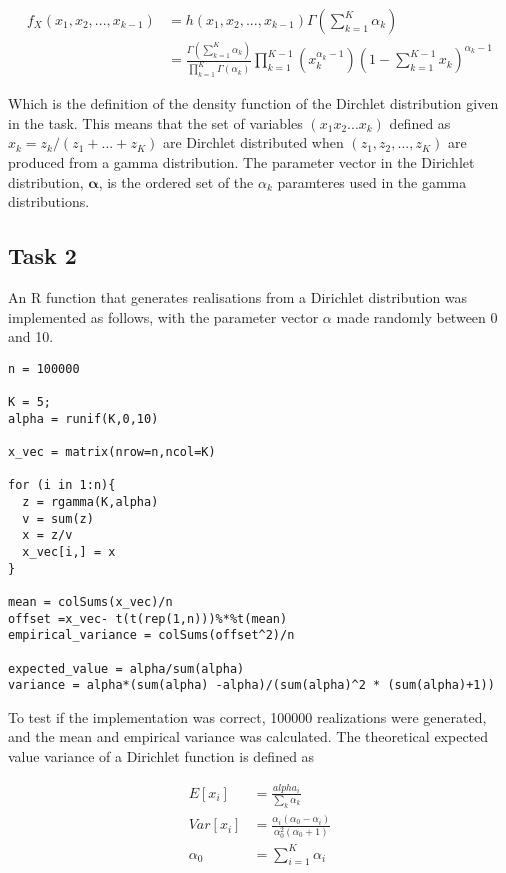\documentclass{article}
\begin{document}
\begin{align}
    f_X(x_1, x_2, ..., x_{k-1}) &= h(x_1,x_2,...,x_{k-1}) \Gamma(\sum_{k=1}^{K}\alpha_k) \\
    &= \frac{\Gamma(\sum_{k=1}^{K}\alpha_k)}{\prod_{k=1}^K \Gamma(\alpha_k)} \prod_{k=1}^{K-1} \left( x_k^{\alpha_k-1} \right) \left( 1 - \sum_{k=1}^{K-1} x_k \right)^{\alpha_k-1}
\end{align}

Which is the definition of the density function of the Dirchlet distribution given in the task. This means that the set of variables $(x_1 x_2 ... x_k)$ defined as $x_k = z_k / (z_1 + ... + z_K)$ are Dirchlet distributed when $(z_1, z_2, ... , z_K)$ are produced from a gamma distribution. The parameter vector in the Dirichlet distribution, $\mathbf{\alpha}$, is the ordered set of the $\alpha_k$ paramteres used in the gamma distributions.


\subsection{Task 2}

An R function that generates realisations from a Dirichlet distribution was implemented as follows, with the parameter vector $\alpha$ made randomly between 0 and 10. 


\begin{lstlisting}
n = 100000

K = 5;
alpha = runif(K,0,10)

x_vec = matrix(nrow=n,ncol=K)

for (i in 1:n){
  z = rgamma(K,alpha)
  v = sum(z)
  x = z/v
  x_vec[i,] = x
}

mean = colSums(x_vec)/n
offset =x_vec- t(t(rep(1,n)))%*%t(mean)
empirical_variance = colSums(offset^2)/n

expected_value = alpha/sum(alpha)
variance = alpha*(sum(alpha) -alpha)/(sum(alpha)^2 * (sum(alpha)+1)) 
\end{lstlisting}

To test if the implementation was correct, 100000 realizations were generated, and the mean and empirical variance was calculated. The theoretical expected value variance of a Dirichlet function is defined as 

\begin{align}
    E[x_i] &= \frac{alpha_i}{\sum_k \alpha_k}\\
    Var[x_i] &= \frac{\alpha_i (\alpha_0 - \alpha_i)}{\alpha_0^2 (\alpha_0 + 1)}\\
    \alpha_0 &= \sum_{i=1}^{K} \alpha_i
\end{align}
\end{document}
